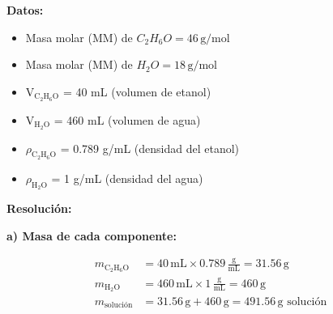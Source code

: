 \documentclass{article}
\begin{document}
\begin{multicols}{2} %
\noindent\textbf{Datos:} %
\begin{itemize}
    \item Masa molar (MM) de \(C_2H_6O = 46 \, \text{g/mol}\)
    \item Masa molar (MM) de \(H_2O = 18 \, \text{g/mol}\)
\end{itemize}

\textbf{} %
\begin{itemize}
\item V$_{\text{C}_2\text{H}_6\text{O}}$ = 40 mL (volumen de etanol)
\item V$_{\text{H}_2\text{O}}$ = 460 mL (volumen de agua)
\item $\rho_{\text{C}_2\text{H}_6\text{O}}$ = 0.789 g/mL (densidad del etanol)
\item $\rho_{\text{H}_2\text{O}}$ = 1 g/mL (densidad del agua)
\end{itemize}

\columnbreak %

\noindent\textbf{Resolución:} %

\textbf{a) Masa de cada componente:}

\begin{align*}
    m_{\text{C}_2\text{H}_6\text{O}} &= 40 \, \text{mL} \times 0.789 \, \frac{\text{g}}{\text{mL}} = 31.56 \, \text{g} \\[10pt]
    m_{\text{H}_2\text{O}} &= 460 \, \text{mL} \times 1 \, \frac{\text{g}}{\text{mL}} = 460 \, \text{g} \\[10pt]
    m_{\text{solución}} &= 31.56 \, \text{g} + 460 \, \text{g} = 491.56 \, \text{g solución}
\end{align*}


\end{multicols}
\end{document}
